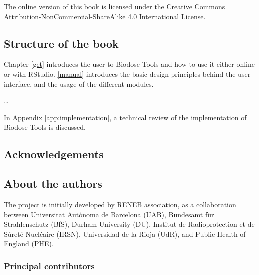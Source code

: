 \documentclass[]{scrartcl}
\begin{document}
The online version of this book is licensed under the \href{http://creativecommons.org/licenses/by-nc-sa/4.0/}{Creative Commons Attribution-NonCommercial-ShareAlike 4.0 International License}.

\hypertarget{structure-of-the-book}{%
\subsection*{Structure of the book}\label{structure-of-the-book}}

Chapter \ref{get} introduces the user to Biodose Tools and how to use it either online or with RStudio. \ref{manual} introduces the basic design principles behind the user interface, and the usage of the different modules.

\ldots{}

In Appendix \ref{app:implementation}, a technical review of the implementation of Biodose Tools is discussed.

\hypertarget{acknowledgements}{%
\subsection*{Acknowledgements}\label{acknowledgements}}

\hypertarget{about-the-authors}{%
\subsection*{About the authors}\label{about-the-authors}}

The project is initially developed by \href{http://www.reneb.net}{RENEB} association, as a collaboration between Universitat Autònoma de Barcelona (UAB), Bundesamt für Strahlenschutz (BfS), Durham University (DU), Institut de Radioprotection et de Sûreté Nucléaire (IRSN), Universidad de la Rioja (UdR), and Public Health of England (PHE).

\hypertarget{principal-contributors}{%
\subsubsection*{Principal contributors}\label{principal-contributors}}
\end{document}
